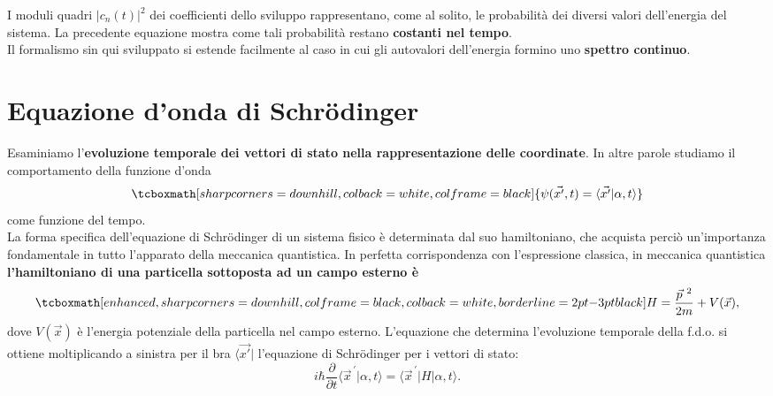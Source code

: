I moduli quadri $\vert c_n(t)\vert^2$ dei coefficienti dello sviluppo rappresentano, come al solito, le probabilità dei diversi valori dell'energia del sistema. La precedente equazione mostra come tali probabilità restano \textbf{costanti nel tempo}.\\

Il formalismo sin qui sviluppato si estende facilmente al caso in cui gli autovalori dell'energia formino uno \textbf{spettro continuo}.
\section[ Equazione d'onda di Schrödinger]{Equazione d'onda di Schr\"{o}dinger}
Esaminiamo l'\textbf{evoluzione temporale dei vettori di stato nella rappresentazione delle coordinate}. In altre parole studiamo il comportamento della funzione d'onda
	\begin{equation}
		\tcboxmath[sharp corners=downhill, colback=white, colframe=black]{
		\psi (\vec{x'}, t) = \langle \vec{x'}\vert \alpha, t \rangle
		}
	\end{equation}
come funzione del tempo.\\

La forma specifica dell'equazione di Schr\"{o}dinger di un sistema fisico è determinata dal suo hamiltoniano, che acquista perciò un'importanza fondamentale in tutto l'apparato della meccanica quantistica. In perfetta corrispondenza con l'espressione classica, in meccanica quantistica \textbf{l'hamiltoniano di una particella sottoposta ad un campo esterno è}
	\begin{equation}
		\tcboxmath[enhanced, sharp corners=downhill, colframe=black, colback=white, borderline={2pt}{-3pt}{black}]{
			H= \frac{\vec{p}^{\ 2}}{2m}+V(\vec{x}),
			}
	\label{eq:cap8_5}
	\end{equation}
dove $V(\vec{x})$ è l'energia potenziale della particella nel campo esterno.		
L'equazione che determina l'evoluzione temporale della f.d.o. si ottiene moltiplicando a sinistra per il bra $\langle \vec{x'}\vert $ l'equazione di Schr\"{o}dinger per i vettori di stato:
	\begin{equation}
		i\hbar \frac{\partial}{\partial t} \langle {\vec{x}}^{\, \prime}\vert \alpha , t \rangle = \langle {\vec{x}}^{\, \prime}\vert H \vert \alpha , t \rangle.
	\end{equation}\\
	
